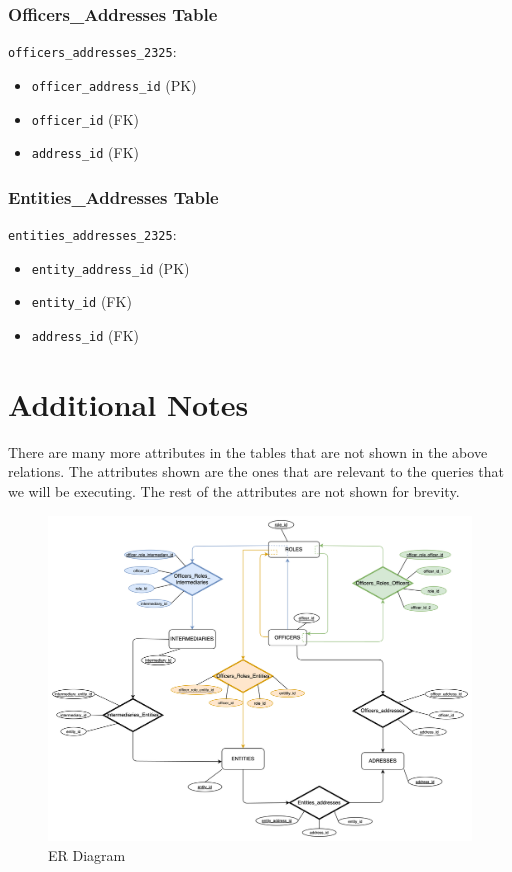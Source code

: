 \documentclass{article}
\begin{document}
\begin{minipage}{0.5\textwidth}
    \subsubsection*{Officers\_Addresses Table}
    \texttt{officers\_addresses\_2325}:
    \begin{itemize}
        \item \texttt{officer\_address\_id} (PK)
        \item \texttt{officer\_id} (FK)
        \item \texttt{address\_id} (FK)
    \end{itemize}

    \subsubsection*{Entities\_Addresses Table}
    \texttt{entities\_addresses\_2325}:
    \begin{itemize}
        \item \texttt{entity\_address\_id} (PK)
        \item \texttt{entity\_id} (FK)
        \item \texttt{address\_id} (FK)
    \end{itemize}

\end{minipage}


\section*{\centering Additional Notes}
There are many more attributes in the tables that are not shown in the above relations. The attributes shown are the ones that are relevant to the queries that we will be executing. The rest of the attributes are not shown for brevity.





\begin{figure}[h]
    \centering
    \includegraphics[width=\textwidth]{er.png}
    \caption{ER Diagram}
    \label{fig:er-diagram}
\end{figure}
\end{document}
